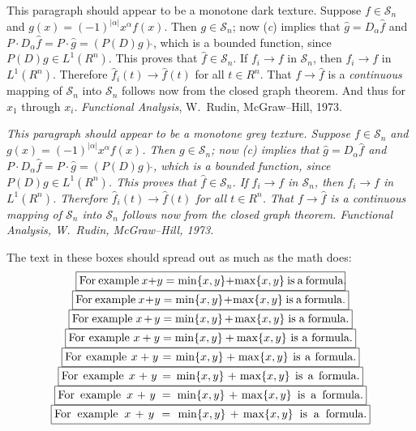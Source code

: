 \documentclass[fleqn]{article}
\newenvironment{boldface}{\bgroup\mathversion{bold}%
  \def\it{\fontseries{m}\fontshape{it}\selectfont}%
  \fontseries{m}\selectfont }{\egroup}
\begin{document}
\begin{boldface}
This paragraph should appear to be a monotone dark texture.  Suppose
\(f \in \mathcal{S}_n\) and \(g(x) = (-1)^{|\alpha|}x^\alpha
f(x)\).  Then \(g \in \mathcal{S}_n\); now (\emph{c}) implies
that \(\hat g = D_\alpha \hat f\) and \(P \cdot D_\alpha\hat
f = P \cdot \hat g = (P(D)g)\hat{}\), which is a bounded function,
since \(P(D)g \in L^1(R^n)\).  This proves that \(\hat f \in
\mathcal S_n\).  If \(f_i \rightarrow f\) in \(\mathcal S_n\),
then \(f_i \rightarrow f\) in \(L^1(R^n)\).  Therefore \(\hat
f_i(t) \rightarrow \hat f(t)\) for all \(t \in R^n\).  That \(f
\rightarrow \hat f\) is a \emph{continuous} mapping of
\(\mathcal S_n\) into \(\mathcal S_n\) follows now from the
closed graph theorem.  And thus for \(x_1\) through \(x_i\).
\emph{Functional Analysis}, W.~Rudin, McGraw--Hill, 1973.
\end{boldface}

{\itshape This paragraph should appear to be a monotone grey texture.
Suppose \(f \in \mathcal{S}_n\) and \(g(x) =
(-1)^{|\alpha|}x^\alpha f(x)\).  Then \(g \in \mathcal{S}_n\);
now (\emph{c}) implies that \(\hat g = D_\alpha \hat f\) and
\(P \cdot D_\alpha\hat f = P \cdot \hat g = (P(D)g)\hat{}\),
which is a bounded function, since \(P(D)g \in L^1(R^n)\).  This
proves that \(\hat f \in \mathcal S_n\).  If \(f_i \rightarrow
f\) in \(\mathcal S_n\), then \(f_i \rightarrow f\) in
\(L^1(R^n)\).  Therefore \(\hat f_i(t) \rightarrow \hat f(t)\)
for all \(t \in R^n\).  That \(f \rightarrow \hat f\) is a
\emph{continuous} mapping of \(\mathcal S_n\) into \(\mathcal
S_n\) follows now from the closed graph theorem.  \emph{Functional
Analysis}, W.~Rudin, McGraw--Hill, 1973.}

The text in these boxes should spread out as much as the math does:
$$\begin{array}{c}
   \framebox[.95\width][s]{For example \(x+y = \min\{x,y\}
      + \max\{x,y\}\) is a formula.} \\
   \framebox[.975\width][s]{For example \(x+y = \min\{x,y\}
      + \max\{x,y\}\) is a formula.} \\
   \framebox[\width][s]{For example \(x+y = \min\{x,y\}
      + \max\{x,y\}\) is a formula.} \\
   \framebox[1.025\width][s]{For example \(x+y = \min\{x,y\}
      + \max\{x,y\}\) is a formula.} \\
   \framebox[1.05\width][s]{For example \(x+y = \min\{x,y\}
      + \max\{x,y\}\) is a formula.} \\
   \framebox[1.075\width][s]{For example \(x+y = \min\{x,y\}
      + \max\{x,y\}\) is a formula.} \\
   \framebox[1.1\width][s]{For example \(x+y = \min\{x,y\}
      + \max\{x,y\}\) is a formula.} \\
   \framebox[1.125\width][s]{For example \(x+y = \min\{x,y\}
      + \max\{x,y\}\) is a formula.} \\
\end{array}$$
\end{document}
